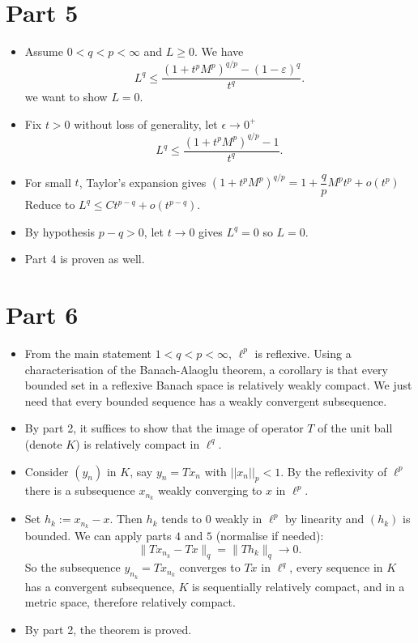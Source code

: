\documentclass[10pt]{article}
\begin{document}
\newpage

\section*{Part 5}

\begin{itemize}
    \item Assume $0 < q < p < \infty$ and $L \geq 0$. We have \[
    L^q
    \le
        \frac{(1+t^pM^p)^{q/p}-(1-\varepsilon)^q}{t^q}.
     \]
    we want to show $L = 0$.
    \item Fix $t > 0$ without loss of generality, let $\epsilon \rightarrow 0^+$
    \[
    L^q
    \le
        \frac{(1+t^pM^p)^{q/p}-1}{t^q}.
    \]
    \item For small $t$, Taylor's expansion gives $(1+t^pM^p)^{q/p} = 1 + \dfrac{q}{p} M^p t^p + o(t^p)$
    Reduce to $L^q \leq C t^{p-q} + o(t^{p-q})$.
    \item By hypothesis $p - q > 0$, let $t \rightarrow 0$ gives $L^q = 0$ so $L = 0$.
    \item Part 4 is proven as well.
\end{itemize}

\section*{Part 6}

\begin{itemize}
    \item From the main statement $1 < q < p < \infty$, $\ell^p$ is reflexive. Using a characterisation of the Banach-Alaoglu theorem, a corollary is that every bounded set in a reflexive Banach space is relatively weakly compact. We just need that every bounded sequence has a weakly convergent subsequence.
    \item By part 2, it suffices to show that the image of operator $T$ of the unit ball (denote $K$) is relatively compact in $\ell^q$.
    \item Consider $(y_n)$ in $K$, say $y_n = T x_n$ with $||x_n||_p < 1$. By the reflexivity of $\ell^p$ there is a subsequence $x_{n_k}$ weakly converging to $x$ in $\ell^p$. 
    \item Set $h_k := x_{n_k} - x$. Then $h_k$ tends to $0$ weakly in $\ell^p$ by linearity and $(h_k)$ is bounded. We can apply parts $4$ and $5$ (normalise if needed):
    \[
    \|Tx_{n_k}-Tx\|_q
    =
    \|Th_k\|_q
    \to 0.
    \]
    So the subsequence $y_{n_k} = T x_{n_k}$ converges to $Tx$ in $\ell^q$, every sequence in $K$ has a convergent subsequence, $K$ is sequentially relatively compact, and in a metric space, therefore relatively compact.
    \item By part 2, the theorem is proved.
\end{itemize}
\end{document}
